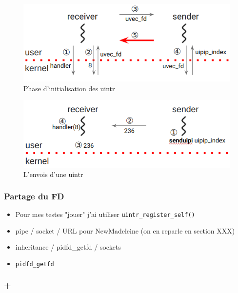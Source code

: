 \begin{figure}[H]
  \includegraphics[width=\textwidth]{images/uintrInit.png}
  \caption{Phase d'initialisation des uintr}
  \label{fig:initUintr}
\end{figure}
\begin{figure}[H]
  \includegraphics[width=\textwidth]{images/uintrSend.png}
  \caption{L'envois d'une uintr}
  \label{fig:sendUintr}
\end{figure}

\subsubsection{Partage du FD}

\begin{itemize}
  \item Pour mes testes "jouer" j'ai utiliser \verb|uintr_register_self()|
  \item pipe / socket / URL pour NewMadeleine (on en reparle en section XXX)
  \item inheritance / pidfd_getfd / sockets
  \item \verb|pidfd_getfd|
\end{itemize}

\subsubsection{+}

